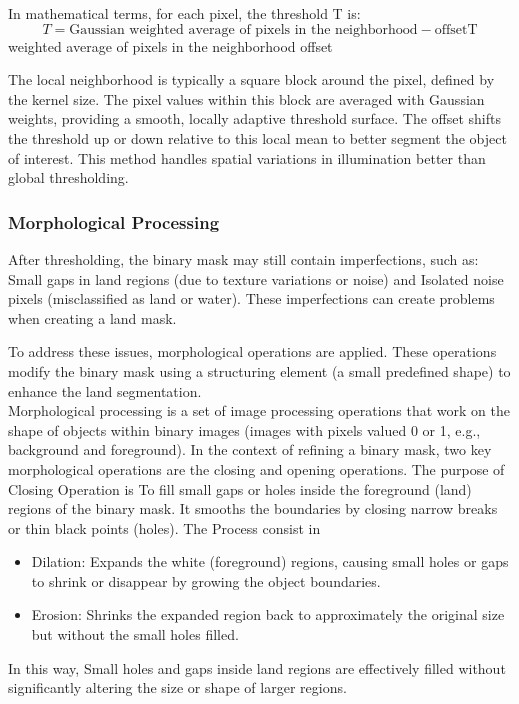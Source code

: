 \documentclass{article}
\begin{document}
	In mathematical terms, for each pixel, the threshold T is: $$T=\text{Gaussian weighted average of pixels in the neighborhood}-\text{offsetT}$$ weighted average of pixels in the neighborhood offset
	
	The local neighborhood is typically a square block around the pixel, defined by the kernel size. The pixel values within this block are averaged with Gaussian weights, providing a smooth, locally adaptive threshold surface. The offset shifts the threshold up or down relative to this local mean to better segment the object of interest. This method handles spatial variations in illumination better than global thresholding. 
	
	\subsubsection{Morphological Processing}
	After thresholding, the binary mask may still contain imperfections, such as: Small gaps in land regions (due to texture variations or noise) and Isolated noise pixels (misclassified as land or water). These imperfections can create problems when creating a land mask.
	
	To address these issues, morphological operations are applied. These operations modify the binary mask using a structuring element (a small predefined shape) to enhance the land segmentation.\\
	
	Morphological processing is a set of image processing operations that work on the shape of objects within binary images (images with pixels valued 0 or 1, e.g., background and foreground). In the context of refining a binary mask, two key morphological operations are the closing and opening operations. The purpose of Closing Operation is To fill small gaps or holes inside the foreground (land) regions of the binary mask. It smooths the boundaries by closing narrow breaks or thin black points (holes). The Process consist in
	\begin{itemize}
		\item Dilation: Expands the white (foreground) regions, causing small holes or gaps to shrink or disappear by growing the object boundaries. \item Erosion: Shrinks the expanded region back to approximately the original size but without the small holes filled. \end{itemize}
	In this way, Small holes and gaps inside land regions are effectively filled without significantly altering the size or shape of larger regions.\\
	
\end{document}
